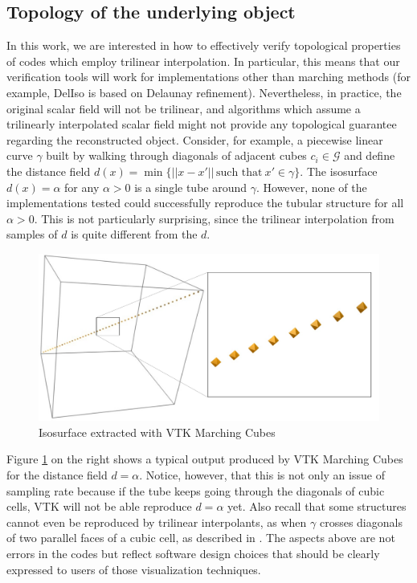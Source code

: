 \subsection{Topology of the underlying object}
In this work, we are interested in how to effectively verify
topological properties of codes which employ trilinear
interpolation. In particular, this means that our verification tools
will work for implementations other than marching methods (for
example, DelIso is based on Delaunay refinement).
%
Nevertheless, in practice, the original scalar field will not be
trilinear, and algorithms which assume a trilinearly interpolated
scalar field might not provide any topological guarantee regarding the
reconstructed object.
Consider, for example, a piecewise linear curve $\gamma$ built by
walking through diagonals of adjacent cubes $c_i \in \mathcal{G}$ and
define the distance field $d(x) = \min\{||x - x'||\, \text{such
  that}\ x'\in\gamma\}$. The isosurface $d(x) = \alpha$ for any
$\alpha > 0$ is a single tube around $\gamma$.  However, none of the
implementations tested could successfully reproduce the tubular
structure for all $\alpha > 0$. This is not particularly surprising,
since the trilinear interpolation from samples of $d$ is quite
different from the $d$.
\begin{figure}[b]
\centering
\includegraphics[width=0.5\linewidth]{chapter3/figures/distance-field.pdf}
\caption{\label{fig:chap4:vtk} Isosurface extracted with VTK Marching Cubes}
\end{figure}
Figure \ref{fig:chap4:vtk} on the right shows a typical output produced by VTK
Marching Cubes for the distance field $d = \alpha$. Notice, however,
that this is not only an issue of sampling rate because if the tube
keeps going through the diagonals of cubic cells, VTK will not be able
reproduce $d = \alpha$ yet.  Also recall that some structures cannot
even be reproduced by trilinear interpolants, as when
$\gamma$ crosses diagonals of two parallel faces of a cubic cell, as
described in \cite{Chernyaev95marchingcubes, Pascucci03}.  The aspects
above are not errors in the codes but reflect software design choices
that should be clearly expressed to users of those visualization
techniques.

